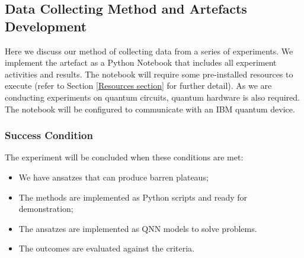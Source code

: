 \subsection{Data Collecting Method and Artefacts Development}
\label{Data Collecting Section}
Here we discuss our method of collecting data from a series of experiments.
We implement the artefact as a Python Notebook that includes all experiment activities and results.
The notebook will require some pre-installed resources to execute (refer to Section \ref{Resources section} for further detail).
As we are conducting experiments on quantum circuits, quantum hardware is also required.
The notebook will be configured to communicate with an IBM quantum device.

\subsubsection{Success Condition}
The experiment will be concluded when these conditions are met:
\begin{itemize}
    \item We have ansatzes that can produce barren plateaus;
    \item The methods are implemented as Python scripts and ready for demonstration;
    \item The ansatzes are implemented as QNN models to solve problems.
    \item The outcomes are evaluated against the criteria.
\end{itemize}



